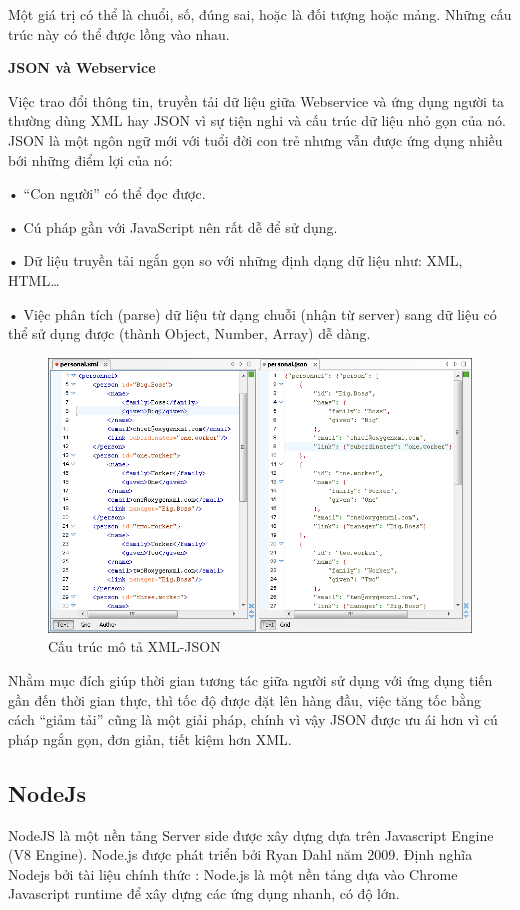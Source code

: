 Một giá trị có thể là chuổi, số, đúng sai, hoặc là đối tượng hoặc mảng. Những cấu trúc này có thể được lồng vào nhau.

\textbf{JSON và Webservice}

Việc trao đổi thông tin, truyền tải dữ liệu giữa Webservice và ứng dụng người ta thường dùng XML hay JSON vì sự tiện nghi và cấu trúc dữ liệu nhỏ gọn của nó. JSON là một ngôn ngữ mới với tuổi đời con trẻ nhưng vẫn được ứng dụng nhiều bới những điểm lợi của nó:

• “Con người” có thể đọc được.

• Cú pháp gần với JavaScript nên rất dễ để sử dụng.

• Dữ liệu truyền tải ngắn gọn so với những định dạng dữ liệu như: XML, HTML…

• Việc phân tích (parse) dữ liệu từ dạng chuỗi (nhận từ server) sang dữ liệu có thể sử dụng được (thành Object, Number, Array) dễ dàng.
\begin{figure}[H]
	\centering    
	\includegraphics[width=1.0\textwidth]{json3}
	\caption[Cấu trúc mô tả XML-JSON]{Cấu trúc mô tả XML-JSON}
	\label{fig: json3}
\end{figure}
Nhằm mục đích giúp thời gian tương tác giữa người sử dụng với ứng dụng tiến gần đến thời gian thực, thì tốc độ được đặt lên hàng đầu, việc tăng tốc bằng cách “giảm tải” cũng là một giải pháp, chính vì vậy JSON được ưu ái hơn vì cú pháp ngắn gọn, đơn giản, tiết kiệm hơn XML.



\subsection{NodeJs}
NodeJS là một nền tảng Server side được xây dựng dựa trên Javascript Engine (V8 Engine). Node.js được phát triển bởi Ryan Dahl năm 2009. Định nghĩa Nodejs bởi tài liệu chính thức : Node.js là một nền tảng dựa vào Chrome Javascript runtime để xây dựng các ứng dụng nhanh, có độ lớn. 

